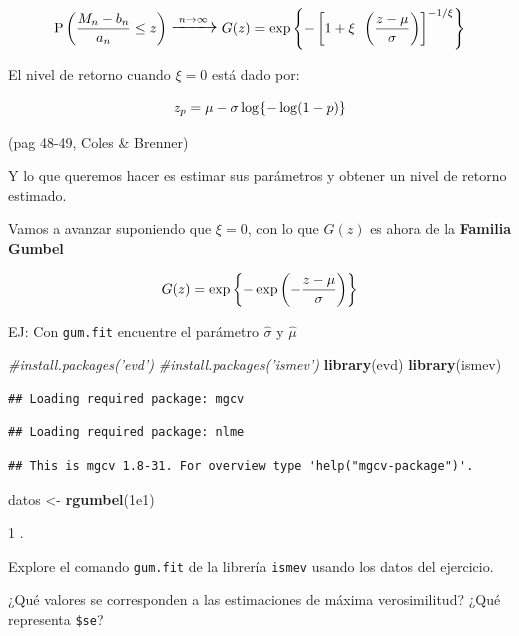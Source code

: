 \documentclass[
]{article}
\newenvironment{Shaded}{\begin{snugshade}}{\end{snugshade}}
\newcommand{\CommentTok}[1]{\textcolor[rgb]{0.56,0.35,0.01}{\textit{#1}}}
\newcommand{\FloatTok}[1]{\textcolor[rgb]{0.00,0.00,0.81}{#1}}
\newcommand{\KeywordTok}[1]{\textcolor[rgb]{0.13,0.29,0.53}{\textbf{#1}}}
\newcommand{\NormalTok}[1]{#1}
\newcommand{\StringTok}[1]{\textcolor[rgb]{0.31,0.60,0.02}{#1}}
\begin{document}
\[\Large \mathrm P \left(\frac{M_n-b_n}{a_n} \leq z \right) \xrightarrow[]{n\rightarrow \infty} G(z) = \exp\left\{ - \left[ 1 + \xi \ \left( \frac{z-\mu}{\sigma} \right) \right]^{-1/\xi} \right\} \]

El nivel de retorno cuando \(\xi = 0\) está dado por:

\[\Large z_p = \mu - \sigma \log\{-\log(1-p)\}\]

(pag 48-49, Coles \& Brenner)

Y lo que queremos hacer es estimar sus parámetros y obtener un nivel de
retorno estimado.

Vamos a avanzar suponiendo que \(\xi = 0\), con lo que \(G(z)\) es ahora
de la \textbf{Familia Gumbel}

\[\Large G(z) = \exp \left\{ -\exp \left( -\frac{z-\mu}{\sigma} \right) \right\}\]

EJ: Con \texttt{gum.fit} encuentre el parámetro \(\hat \sigma\) y
\(\hat \mu\)

\begin{Shaded}
\begin{Highlighting}[]
\CommentTok{#install.packages('evd')}
\CommentTok{#install.packages('ismev')}
\KeywordTok{library}\NormalTok{(evd)}
\KeywordTok{library}\NormalTok{(ismev)}
\end{Highlighting}
\end{Shaded}

\begin{verbatim}
## Loading required package: mgcv
\end{verbatim}

\begin{verbatim}
## Loading required package: nlme
\end{verbatim}

\begin{verbatim}
## This is mgcv 1.8-31. For overview type 'help("mgcv-package")'.
\end{verbatim}

\begin{Shaded}
\begin{Highlighting}[]
\NormalTok{datos <-}\StringTok{ }\KeywordTok{rgumbel}\NormalTok{(}\FloatTok{1e1}\NormalTok{)}
\end{Highlighting}
\end{Shaded}

1 .

Explore el comando \texttt{gum.fit} de la librería \texttt{ismev} usando
los datos del ejercicio.

¿Qué valores se corresponden a las estimaciones de máxima verosimilitud?
¿Qué representa \texttt{\$se}?
\end{document}
